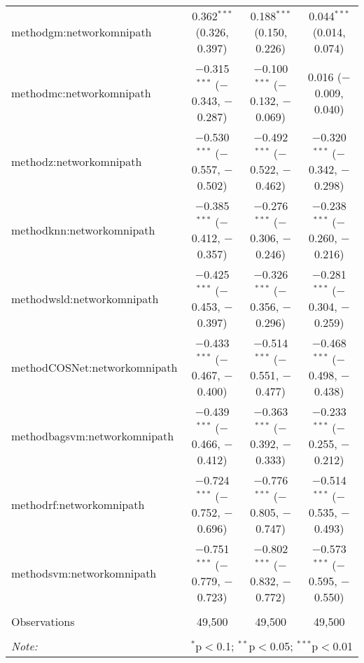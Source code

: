 \begin{table}[!htbp]
\begin{tabular}{@{\extracolsep{5pt}}lccc}
  methodgm:networkomnipath & 0.362$^{***}$ (0.326, 0.397) & 0.188$^{***}$ (0.150, 0.226) & 0.044$^{***}$ (0.014, 0.074) \\ 
  methodmc:networkomnipath & $-$0.315$^{***}$ ($-$0.343, $-$0.287) & $-$0.100$^{***}$ ($-$0.132, $-$0.069) & 0.016 ($-$0.009, 0.040) \\ 
  methodz:networkomnipath & $-$0.530$^{***}$ ($-$0.557, $-$0.502) & $-$0.492$^{***}$ ($-$0.522, $-$0.462) & $-$0.320$^{***}$ ($-$0.342, $-$0.298) \\ 
  methodknn:networkomnipath & $-$0.385$^{***}$ ($-$0.412, $-$0.357) & $-$0.276$^{***}$ ($-$0.306, $-$0.246) & $-$0.238$^{***}$ ($-$0.260, $-$0.216) \\ 
  methodwsld:networkomnipath & $-$0.425$^{***}$ ($-$0.453, $-$0.397) & $-$0.326$^{***}$ ($-$0.356, $-$0.296) & $-$0.281$^{***}$ ($-$0.304, $-$0.259) \\ 
  methodCOSNet:networkomnipath & $-$0.433$^{***}$ ($-$0.467, $-$0.400) & $-$0.514$^{***}$ ($-$0.551, $-$0.477) & $-$0.468$^{***}$ ($-$0.498, $-$0.438) \\ 
  methodbagsvm:networkomnipath & $-$0.439$^{***}$ ($-$0.466, $-$0.412) & $-$0.363$^{***}$ ($-$0.392, $-$0.333) & $-$0.233$^{***}$ ($-$0.255, $-$0.212) \\ 
  methodrf:networkomnipath & $-$0.724$^{***}$ ($-$0.752, $-$0.696) & $-$0.776$^{***}$ ($-$0.805, $-$0.747) & $-$0.514$^{***}$ ($-$0.535, $-$0.493) \\ 
  methodsvm:networkomnipath & $-$0.751$^{***}$ ($-$0.779, $-$0.723) & $-$0.802$^{***}$ ($-$0.832, $-$0.772) & $-$0.573$^{***}$ ($-$0.595, $-$0.550) \\ 
 \hline \\[-1.8ex] 
Observations & 49,500 & 49,500 & 49,500 \\ 
\hline 
\hline \\[-1.8ex] 
\textit{Note:}  & \multicolumn{3}{r}{$^{*}$p$<$0.1; $^{**}$p$<$0.05; $^{***}$p$<$0.01} \\ 
\end{tabular} 
\end{table} 
